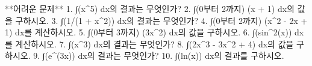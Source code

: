 \documentclass[fleqn]{article}
\begin{document}
**어려운 문제**  
1. ∫(x^5) dx의 결과는 무엇인가?  
2. ∫(0부터 2까지) (x + 1) dx의 값을 구하시오.  
3. ∫(1/(1 + x^2)) dx의 결과는 무엇인가?  
4. ∫(0부터 2까지) (x^2 - 2x + 1) dx를 계산하시오.  
5. ∫(0부터 3까지) (3x^2) dx의 값을 구하시오.  
6. ∫(sin^2(x)) dx를 계산하시오.  
7. ∫(x^3) dx의 결과는 무엇인가?  
8. ∫(2x^3 - 3x^2 + 4) dx의 값을 구하시오.  
9. ∫(e^(3x)) dx의 결과는 무엇인가?  
10. ∫(ln(x)) dx의 결과를 구하시오.  

      
        
\end{document}
